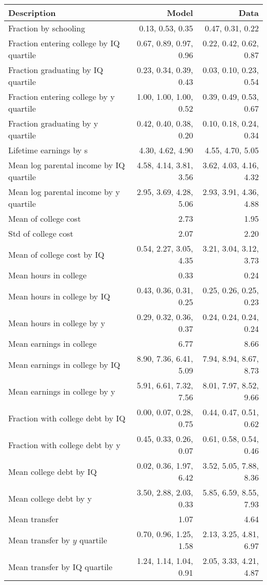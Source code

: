 \begin{tabular}{lrr}
\hline
Description & Model  & Data  \\
\hline
Fraction by schooling & 0.13, 0.53, 0.35  & 0.47, 0.31, 0.22  \\
Fraction entering college by IQ quartile & 0.67, 0.89, 0.97, 0.96  & 0.22, 0.42, 0.62, 0.87  \\
Fraction graduating by IQ quartile & 0.23, 0.34, 0.39, 0.43  & 0.03, 0.10, 0.23, 0.54  \\
Fraction entering college by y quartile & 1.00, 1.00, 1.00, 0.52  & 0.39, 0.49, 0.53, 0.67  \\
Fraction graduating by y quartile & 0.42, 0.40, 0.38, 0.20  & 0.10, 0.18, 0.24, 0.34  \\
Lifetime earnings by s & 4.30, 4.62, 4.90  & 4.55, 4.70, 5.05  \\
Mean log parental income by IQ quartile & 4.58, 4.14, 3.81, 3.56  & 3.62, 4.03, 4.16, 4.32  \\
Mean log parental income by y quartile & 2.95, 3.69, 4.28, 5.06  & 2.93, 3.91, 4.36, 4.88  \\
Mean of college cost & 2.73  & 1.95  \\
Std of college cost & 2.07  & 2.20  \\
Mean of college cost by IQ & 0.54, 2.27, 3.05, 4.35  & 3.21, 3.04, 3.12, 3.73  \\
Mean hours in college & 0.33  & 0.24  \\
Mean hours in college by IQ & 0.43, 0.36, 0.31, 0.25  & 0.25, 0.26, 0.25, 0.23  \\
Mean hours in college by y & 0.29, 0.32, 0.36, 0.37  & 0.24, 0.24, 0.24, 0.24  \\
Mean earnings in college & 6.77  & 8.66  \\
Mean earnings in college by IQ & 8.90, 7.36, 6.41, 5.09  & 7.94, 8.94, 8.67, 8.73  \\
Mean earnings in college by y & 5.91, 6.61, 7.32, 7.56  & 8.01, 7.97, 8.52, 9.66  \\
Fraction with college debt by IQ & 0.00, 0.07, 0.28, 0.75  & 0.44, 0.47, 0.51, 0.62  \\
Fraction with college debt by y & 0.45, 0.33, 0.26, 0.07  & 0.61, 0.58, 0.54, 0.46  \\
Mean college debt by IQ & 0.02, 0.36, 1.97, 6.42  & 3.52, 5.05, 7.88, 8.36  \\
Mean college debt by y & 3.50, 2.88, 2.03, 0.33  & 5.85, 6.59, 8.55, 7.93  \\
Mean transfer & 1.07  & 4.64  \\
Mean transfer by $y$ quartile & 0.70, 0.96, 1.25, 1.58  & 2.13, 3.25, 4.81, 6.97  \\
Mean transfer by IQ quartile & 1.24, 1.14, 1.04, 0.91  & 2.05, 3.33, 4.21, 4.87  \\
\hline
\end{tabular}%
